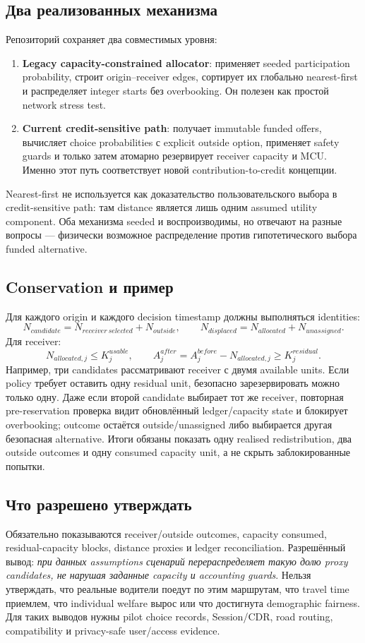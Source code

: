 \documentclass[11pt,a4paper]{article}
\begin{document}
\subsection{Два реализованных механизма}
Репозиторий сохраняет два совместимых уровня:
\begin{enumerate}
\item \textbf{Legacy capacity-constrained allocator}: применяет seeded participation probability, строит origin--receiver edges, сортирует их глобально nearest-first и распределяет integer starts без overbooking. Он полезен как простой network stress test.
\item \textbf{Current credit-sensitive path}: получает immutable funded offers, вычисляет choice probabilities с explicit outside option, применяет safety guards и только затем атомарно резервирует receiver capacity и MCU. Именно этот путь соответствует новой contribution-to-credit концепции.
\end{enumerate}
Nearest-first не используется как доказательство пользовательского выбора в credit-sensitive path: там distance является лишь одним assumed utility component. Оба механизма seeded и воспроизводимы, но отвечают на разные вопросы --- физически возможное распределение против гипотетического выбора funded alternative.

\subsection{Conservation и пример}
Для каждого origin и каждого decision timestamp должны выполняться identities:
\[
N_{candidate}=N_{receiver\ selected}+N_{outside},
\qquad
N_{displaced}=N_{allocated}+N_{unassigned}.
\]
Для receiver:
\[
N_{allocated,j}\le K_j^{usable},
\qquad
A^{after}_j=A^{before}_j-N_{allocated,j}\ge K_j^{residual}.
\]
Например, три candidates рассматривают receiver с двумя available units. Если policy требует оставить одну residual unit, безопасно зарезервировать можно только одну. Даже если второй candidate выбирает тот же receiver, повторная pre-reservation проверка видит обновлённый ledger/capacity state и блокирует overbooking; outcome остаётся outside/unassigned либо выбирается другая безопасная alternative. Итоги обязаны показать одну realised redistribution, два outside outcomes и одну consumed capacity unit, а не скрыть заблокированные попытки.

\subsection{Что разрешено утверждать}
Обязательно показываются receiver/outside outcomes, capacity consumed, residual-capacity blocks, distance proxies и ledger reconciliation. Разрешённый вывод: \emph{при данных assumptions сценарий перераспределяет такую долю proxy candidates, не нарушая заданные capacity и accounting guards}. Нельзя утверждать, что реальные водители поедут по этим маршрутам, что travel time приемлем, что individual welfare вырос или что достигнута demographic fairness. Для таких выводов нужны pilot choice records, Session/CDR, road routing, compatibility и privacy-safe user/access evidence.
\end{document}
